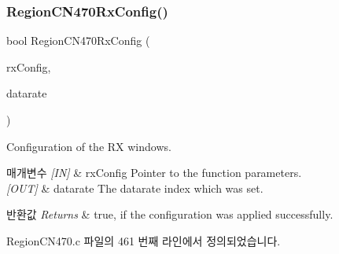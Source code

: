 \subsubsection{\texorpdfstring{Region\+C\+N470\+Rx\+Config()}{RegionCN470RxConfig()}}
{\footnotesize\ttfamily bool Region\+C\+N470\+Rx\+Config (\begin{DoxyParamCaption}\item[{\mbox{\hyperlink{group___r_e_g_i_o_n_ga375c038078dfcfc7ef14280021db719e}{Rx\+Config\+Params\+\_\+t}} $\ast$}]{rx\+Config,  }\item[{int8\+\_\+t $\ast$}]{datarate }\end{DoxyParamCaption})}



Configuration of the RX windows. 


\begin{DoxyParams}{매개변수}
{\em \mbox{[}\+I\+N\mbox{]}} & rx\+Config Pointer to the function parameters.\\
\hline
{\em \mbox{[}\+O\+U\+T\mbox{]}} & datarate The datarate index which was set.\\
\hline
\end{DoxyParams}

\begin{DoxyRetVals}{반환값}
{\em Returns} & true, if the configuration was applied successfully. \\
\hline
\end{DoxyRetVals}


Region\+C\+N470.\+c 파일의 461 번째 라인에서 정의되었습니다.


